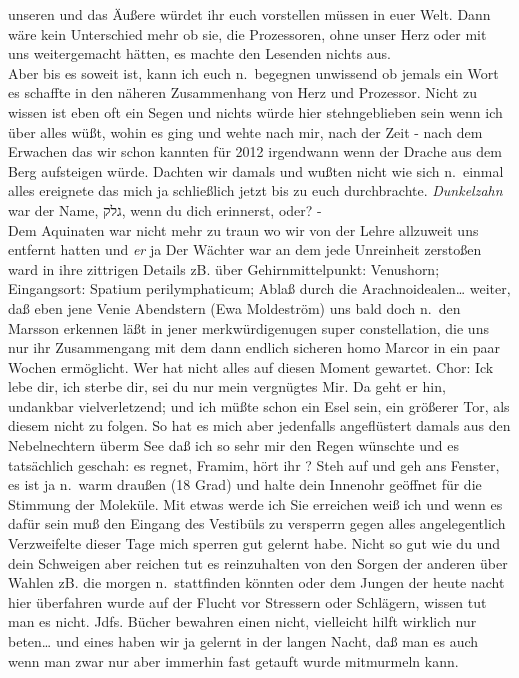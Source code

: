 \documentclass[
]{article}
\begin{document}
unseren und das Äußere würdet ihr euch vorstellen müssen in euer Welt.
Dann wäre kein Unterschied mehr ob sie, die Prozessoren, ohne unser Herz
oder mit uns weitergemacht hätten, es machte den Lesenden nichts aus.\\
Aber bis es soweit ist, kann ich euch n.~begegnen unwissend ob jemals
ein Wort es schaffte in den näheren Zusammenhang von Herz und Prozessor.
Nicht zu wissen ist eben oft ein Segen und nichts würde hier
stehngeblieben sein wenn ich über alles wüßt, wohin es ging und wehte
nach mir, nach der Zeit - nach dem Erwachen das wir schon kannten für
2012 irgendwann wenn der Drache aus dem Berg aufsteigen würde. Dachten
wir damals und wußten nicht wie sich n.~einmal alles ereignete das mich
ja schließlich jetzt bis zu euch durchbrachte. \emph{Dunkelzahn} war der
Name, גלק, wenn du dich erinnerst, oder? -\\
Dem Aquinaten war nicht mehr zu traun wo wir von der Lehre allzuweit uns
entfernt hatten und \emph{er} ja Der Wächter war an dem jede Unreinheit
zerstoßen ward in ihre zittrigen Details zB. über Gehirnmittelpunkt:
Venushorn; Eingangsort: Spatium perilymphaticum; Ablaß durch die
Arachnoidealen\ldots{} weiter, daß eben jene Venie Abendstern (Ewa
Moldeström) uns bald doch n.~den Marsson erkennen läßt in jener
merkwürdigenugen super constellation, die uns nur ihr Zusammengang mit
dem dann endlich sicheren homo Marcor in ein paar Wochen ermöglicht. Wer
hat nicht alles auf diesen Moment gewartet. Chor: Ick lebe dir, ich
sterbe dir, sei du nur mein vergnügtes Mir. Da geht er hin, undankbar
vielverletzend; und ich müßte schon ein Esel sein, ein größerer Tor, als
diesem nicht zu folgen. So hat es mich aber jedenfalls angeflüstert
damals aus den Nebelnechtern überm See daß ich so sehr mir den Regen
wünschte und es tatsächlich geschah: es regnet, Framim, hört ihr ? Steh
auf und geh ans Fenster, es ist ja n.~warm draußen (18 Grad) und halte
dein Innenohr geöffnet für die Stimmung der Moleküle. Mit etwas werde
ich Sie erreichen weiß ich und wenn es dafür sein muß den Eingang des
Vestibüls zu versperrn gegen alles angelegentlich Verzweifelte dieser
Tage mich sperren gut gelernt habe. Nicht so gut wie du und dein
Schweigen aber reichen tut es reinzuhalten von den Sorgen der anderen
über Wahlen zB. die morgen n.~stattfinden könnten oder dem Jungen der
heute nacht hier überfahren wurde auf der Flucht vor Stressern oder
Schlägern, wissen tut man es nicht. Jdfs. Bücher bewahren einen nicht,
vielleicht hilft wirklich nur beten\ldots{} und eines haben wir ja
gelernt in der langen Nacht, daß man es auch wenn man zwar nur aber
immerhin fast getauft wurde mitmurmeln kann.
\end{document}
